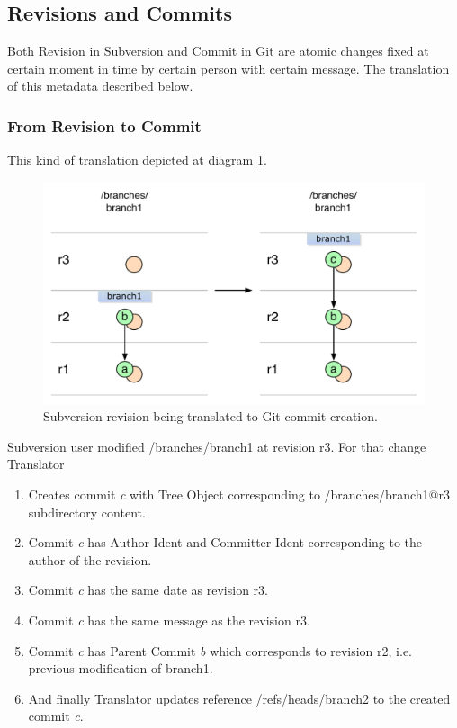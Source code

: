 \subsection{Revisions and Commits}

Both Revision in Subversion and Commit in Git are atomic changes fixed at certain moment in time by certain person with certain message. The translation of this metadata described below.

\subsubsection{From Revision to Commit}

This kind of translation depicted at diagram \ref{single_change_svn_to_git}.

\begin{figure}[!h]
\centering
\includegraphics[width=\linewidth]{img/diagrams/single_change_svn_to_git.pdf}
\caption{Subversion revision being translated to Git commit creation.}
\label{single_change_svn_to_git}
\end{figure}

Subversion user modified /branches/branch1 at revision r3. For that change Translator
\begin{enumerate}
	\item Creates commit \emph{c} with Tree Object corresponding to /branches/branch1@r3 subdirectory content.
	\item Commit \emph{c} has Author Ident and Committer Ident corresponding to the author of the revision.
	\item Commit \emph{c} has the same date as revision r3.
	\item Commit \emph{c} has the same message as the revision r3.
	\item Commit \emph{c} has Parent Commit \emph{b} which corresponds to revision r2, i.e. previous modification of branch1.
	\item And finally Translator updates reference /refs/heads/branch2 to the created commit \emph{c}.
\end{enumerate}

